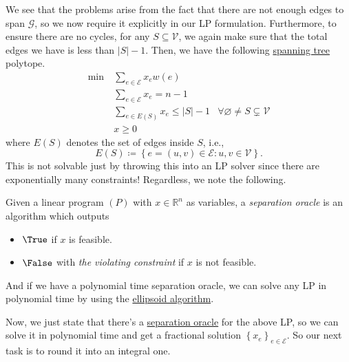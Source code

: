We see that the problems arise from the fact that there are not enough edges to span \(\mathcal{G} \), so we now require it explicitly in our LP formulation. Furthermore, to ensure there are no cycles, for any \(S \subseteq \mathcal{V} \), we again make sure that the total edges we have is less than \(\left\vert S \right\vert - 1\). Then, we have the following \hyperref[def:spanning-tree]{spanning tree} polytope.
\begin{equation}\label{eq:spanning-tree-polytope}
	\begin{aligned}
		\min~ & \sum_{e\in \mathcal{E} } x_e w(e)                                                                          \\
		      & \sum_{e\in \mathcal{E} } x_e = n-1                                                                         \\
		      & \sum_{e\in E(S)} x_e \leq \left\vert S \right\vert - 1 & \forall \varnothing \neq S \subsetneq \mathcal{V} \\
		      & x \geq 0
	\end{aligned}
\end{equation}
where \(E(S)\) denotes the set of edges inside \(S\), i.e.,
\[
	E(S) \coloneqq \left\{ e=(u, v)\in \mathcal{E} \colon u, v\in \mathcal{V}  \right\}.
\]
This is not solvable just by throwing this into an LP solver since there are exponentially many constraints! Regardless, we note the following.
\begin{remark}\label{rmk:separation-oracle}
	Given a linear program \((P)\) with \(x\in \mathbb{R} ^n\) as variables, a \emph{separation oracle} is an algorithm which outputs
	\begin{itemize}
		\item \(\True\) if \(x\) is feasible.
		\item \(\False\) with \emph{the violating constraint} if \(x\) is not feasible.
	\end{itemize}

	And if we have a polynomial time separation oracle, we can solve any LP in polynomial time by using the \href{https://en.wikipedia.org/wiki/Ellipsoid_method}{ellipsoid algorithm}.
\end{remark}

Now, we just state that there's a \hyperref[rmk:separation-oracle]{separation oracle} for the above LP, so we can solve it in polynomial time and get a fractional solution \(\left\{ x_e \right\} _{e\in \mathcal{E}}\). So our next task is to round it into an integral one.

